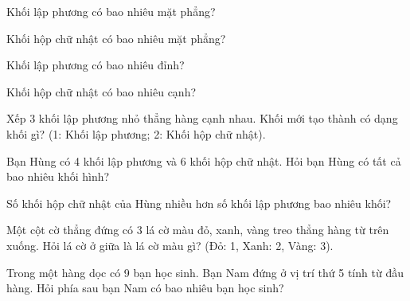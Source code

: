 \begin{ex}
Khối lập phương có bao nhiêu mặt phẳng?
\end{ex}

\begin{ex}
Khối hộp chữ nhật có bao nhiêu mặt phẳng?
\end{ex}

\begin{ex}
Khối lập phương có bao nhiêu đỉnh?
\end{ex}

\begin{ex}
Khối hộp chữ nhật có bao nhiêu cạnh?
\end{ex}

\begin{ex}
Xếp 3 khối lập phương nhỏ thẳng hàng cạnh nhau. Khối mới tạo thành có dạng khối gì? (1: Khối lập phương; 2: Khối hộp chữ nhật).
\end{ex}

\begin{ex}
Bạn Hùng có 4 khối lập phương và 6 khối hộp chữ nhật. Hỏi bạn Hùng có tất cả bao nhiêu khối hình?
\end{ex}

\begin{ex}
Số khối hộp chữ nhật của Hùng nhiều hơn số khối lập phương bao nhiêu khối?
\end{ex}

\begin{ex}
Một cột cờ thẳng đứng có 3 lá cờ màu đỏ, xanh, vàng treo thẳng hàng từ trên xuống. Hỏi lá cờ ở giữa là lá cờ màu gì? (Đỏ: 1, Xanh: 2, Vàng: 3).
\end{ex}

\begin{ex}
Trong một hàng dọc có 9 bạn học sinh. Bạn Nam đứng ở vị trí thứ 5 tính từ đầu hàng. Hỏi phía sau bạn Nam có bao nhiêu bạn học sinh?
\end{ex}

